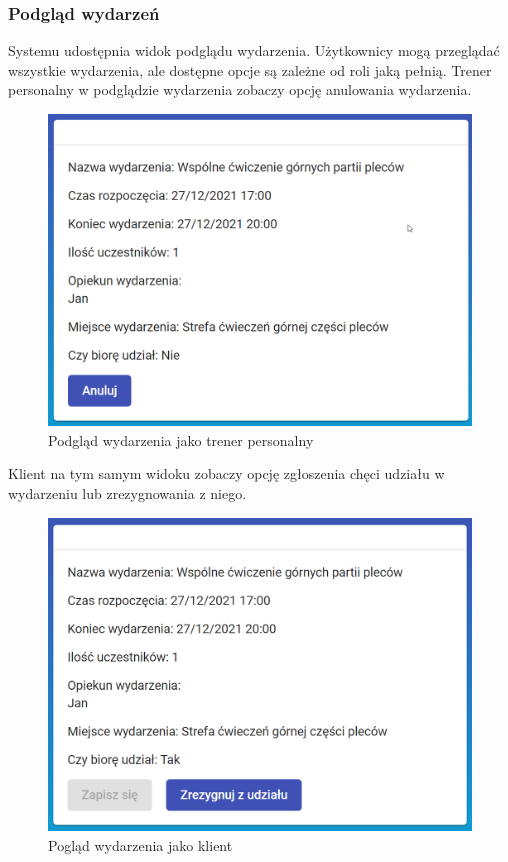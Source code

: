 \documentclass[a4paper,twoside,12pt]{book}
\begin{document}
{\subsubsection{Podgląd wydarzeń}
Systemu udostępnia widok podglądu wydarzenia. Użytkownicy mogą przeglądać wszystkie wydarzenia, ale dostępne opcje są zależne od roli jaką pełnią. Trener personalny w podglądzie wydarzenia zobaczy opcję anulowania wydarzenia.
\begin{figure}[h!]
	\centering
	\includegraphics[width=0.7\linewidth]{../zrzuty_ekranu/dzialanie/wydarzenia/trener_podlad_wydarzenie}
	\caption{Podgląd wydarzenia jako trener personalny}
	\label{fig:trenerpodladwydarzenie}
\end{figure}
\FloatBarrier
Klient na tym samym widoku zobaczy opcję zgłoszenia chęci udziału w wydarzeniu lub zrezygnowania z niego.
\begin{figure}[h!]
	\centering
	\includegraphics[width=1\linewidth]{../zrzuty_ekranu/dzialanie/wydarzenia/klient_podlad_wydarzenia}
	\caption{Pogląd wydarzenia jako klient}
	\label{fig:klientpodladwydarzenia}
\end{figure}
\FloatBarrier
}
\end{document}
